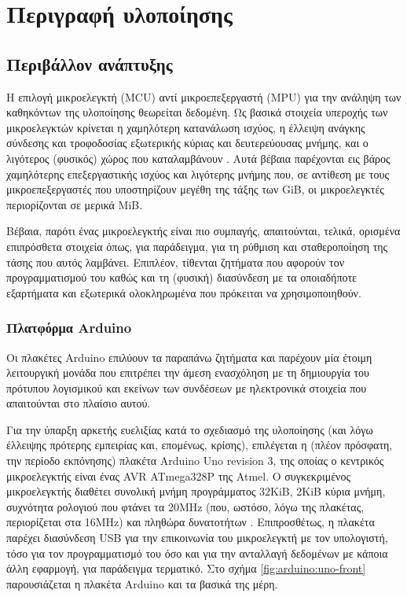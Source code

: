 \chapter{Περιγραφή υλοποίησης}


\section{Περιβάλλον ανάπτυξης}

Η επιλογή μικροελεγκτή (MCU) αντί μικροεπεξεργαστή (MPU) για την ανάληψη των
καθηκόντων της υλοποίησης θεωρείται δεδομένη.
Ως βασικά στοιχεία υπεροχής των μικροελεγκτών κρίνεται η χαμηλότερη κατανάλωση
ισχύος, η έλλειψη ανάγκης σύνδεσης και τροφοδοσίας εξωτερικής κύριας και
δευτερεύουσας μνήμης, και ο λιγότερος (φυσικός) χώρος που καταλαμβάνουν
\parencite[1--2]{atmel13:mpu-mcu}. Αυτά βέβαια παρέχονται εις βάρος χαμηλότερης
επεξεργαστικής ισχύος και λιγότερης μνήμης που, σε αντίθεση με τους
μικροεπεξεργαστές που υποστηρίζουν μεγέθη της τάξης των GiB, οι μικροελεγκτές
περιορίζονται σε μερικά MiB.

Βέβαια, παρότι ένας μικροελεγκτής είναι πιο συμπαγής, απαιτούνται, τελικά,
ορισμένα επιπρόσθετα στοιχεία όπως, για παράδειγμα, για τη ρύθμιση και
σταθεροποίηση της τάσης που αυτός λαμβάνει. Επιπλέον, τίθενται ζητήματα που
αφορούν τον προγραμματισμού του καθώς και τη (φυσική) διασύνδεση με τα
οποιαδήποτε εξαρτήματα και εξωτερικά ολοκληρωμένα που πρόκειται να
χρησιμοποιηθούν.


\subsection{Πλατφόρμα Arduino}
\label{subsec:arduino}

Οι πλακέτες Arduino επιλύουν τα παραπάνω ζητήματα και παρέχουν μία έτοιμη
λειτουργική μονάδα που επιτρέπει την άμεση ενασχόληση με τη δημιουργία του
πρότυπου λογισμικού και εκείνων των συνδέσεων με ηλεκτρονικά στοιχεία που
απαιτούνται στο πλαίσιο αυτού.

Για την ύπαρξη αρκετής ευελιξίας κατά το σχεδιασμό της υλοποίησης (και λόγω
έλλειψης πρότερης εμπειρίας και, επομένως, κρίσης), επιλέγεται η (πλέον
πρόσφατη, την περίοδο εκπόνησης) πλακέτα Arduino Uno revision 3, της οποίας ο
κεντρικός μικροελεγκτής είναι ένας AVR ATmega328P της Atmel. Ο συγκεκριμένος
μικροελεγκτής διαθέτει συνολική μνήμη προγράμματος 32KiB, 2KiB κύρια μνήμη,
συχνότητα ρολογιού που φτάνει τα 20MHz (που, ωστόσο, λόγω της πλακέτας,
περιορίζεται στα 16MHz) και πληθώρα δυνατοτήτων
\parencites[1]{atmel13}{arduino:uno}. Επιπροσθέτως, η πλακέτα παρέχει διασύνδεση
USB για την επικοινωνία του μικροελεγκτή με τον υπολογιστή, τόσο για τον
προγραμματισμό του όσο και για την ανταλλαγή δεδομένων με κάποια άλλη εφαρμογή,
για παράδειγμα τερματικό. Στο σχήμα \ref{fig:arduino:uno-front} παρουσιάζεται η
πλακέτα Arduino και τα βασικά της μέρη.

